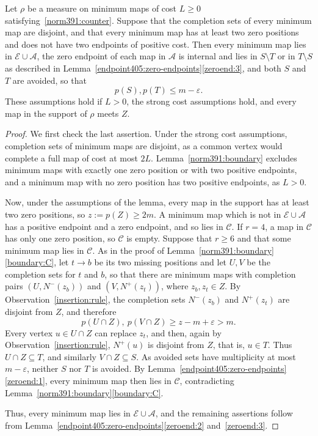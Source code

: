 \begin{lemma}
\label{norm394:zero-extremes}\label{norm394:zero-extremes:rest}
Let $\rho$ be a measure on minimum maps of cost $L\ge0$ satisfying~\eqref{norm391:counter}. Suppose that the completion sets of every minimum map are disjoint, and that every minimum map has at least two zero positions and does not have two endpoints of positive cost.
Then every minimum map lies in $\mathcal E\cup\mathcal A$, the zero endpoint of each map in $\mathcal A$ is internal and lies in $S\setminus T$ or in $T\setminus S$ as described in Lemma~\ref{endpoint405:zero-endpoints}\ref{zeroend:3}, and both $S$ and $T$ are avoided, so that
\begin{equation}\label{norm391:extremal}
 p(S),p(T)\le m-\varepsilon.
\end{equation}
These assumptions hold if $L>0$, the strong cost assumptions hold, and every map in the support of $\rho$ meets $Z$.
\end{lemma}
\begin{proof}
We first check the last assertion. Under the strong cost assumptions, completion sets of minimum maps are disjoint, as a common vertex would complete a full map of cost at most $2L$.
Lemma~\ref{norm391:boundary} excludes minimum maps with exactly one zero position or with two positive endpoints, and a minimum map with no zero position has two positive endpoints, as $L>0$.

Now, under the assumptions of the lemma, every map in the support has at least two zero positions, so $z:=p(Z)\ge2m$.
A minimum map which is not in $\mathcal E\cup\mathcal A$ has a positive endpoint and a zero endpoint, and so lies in $\mathcal C$. If $r=4$, a map in $\mathcal C$ has only one zero position, so $\mathcal C$ is empty. Suppose that $r\ge6$ and that some minimum map lies in $\mathcal C$. As in the proof of Lemma~\ref{norm391:boundary}\ref{boundary:C}, let $t\to b$ be its two missing positions and let $U,V$ be the completion sets for $t$ and $b$, so that there are minimum maps with completion pairs $(U,N^-(z_b))$ and $(V,N^+(z_t))$, where $z_b,z_t\in Z$. By Observation~\ref{insertion:rule}, the completion sets $N^-(z_b)$ and $N^+(z_t)$ are disjoint from $Z$, and therefore
\[
 p(U\cap Z),\ p(V\cap Z)\ge z-m+\varepsilon>m.
\]
Every vertex $u\in U\cap Z$ can replace $z_t$, and then, again by Observation~\ref{insertion:rule}, $N^+(u)$ is disjoint from $Z$, that is, $u\in T$. Thus $U\cap Z\subseteq T$, and similarly $V\cap Z\subseteq S$. As avoided sets have multiplicity at most $m-\varepsilon$, neither $S$ nor $T$ is avoided. By Lemma~\ref{endpoint405:zero-endpoints}\ref{zeroend:1}, every minimum map then lies in $\mathcal C$, contradicting Lemma~\ref{norm391:boundary}\ref{boundary:C}.

Thus, every minimum map lies in $\mathcal E\cup\mathcal A$, and the remaining assertions follow from Lemma~\ref{endpoint405:zero-endpoints}\ref{zeroend:2} and~\ref{zeroend:3}.
\end{proof}


